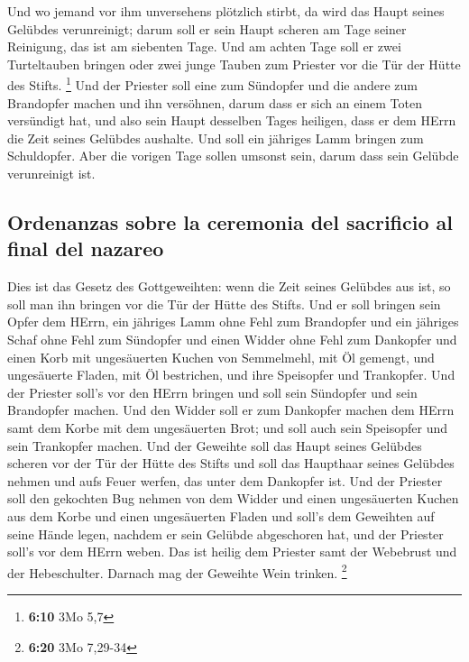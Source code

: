  Und wo jemand vor ihm unversehens plötzlich stirbt, da
wird das Haupt seines Gelübdes verunreinigt; darum soll er sein Haupt
scheren am Tage seiner Reinigung, das ist am siebenten Tage.
 Und am achten Tage soll er zwei Turteltauben bringen
oder zwei junge Tauben zum Priester vor die Tür der Hütte des Stifts.
\footnote{\textbf{6:10} 3Mo 5,7}  Und der Priester soll
eine zum Sündopfer und die andere zum Brandopfer machen und ihn
versöhnen, darum dass er sich an einem Toten versündigt hat, und also
sein Haupt desselben Tages heiligen,  dass er dem HErrn
die Zeit seines Gelübdes aushalte. Und soll ein jähriges Lamm bringen
zum Schuldopfer. Aber die vorigen Tage sollen umsonst sein, darum dass
sein Gelübde verunreinigt ist.

\hypertarget{ordenanzas-sobre-la-ceremonia-del-sacrificio-al-final-del-nazareo}{%
\subsection{Ordenanzas sobre la ceremonia del sacrificio al final del
nazareo}\label{ordenanzas-sobre-la-ceremonia-del-sacrificio-al-final-del-nazareo}}

 Dies ist das Gesetz des Gottgeweihten: wenn die Zeit
seines Gelübdes aus ist, so soll man ihn bringen vor die Tür der Hütte
des Stifts.  Und er soll bringen sein Opfer dem HErrn,
ein jähriges Lamm ohne Fehl zum Brandopfer und ein jähriges Schaf ohne
Fehl zum Sündopfer und einen Widder ohne Fehl zum Dankopfer
 und einen Korb mit ungesäuerten Kuchen von Semmelmehl,
mit Öl gemengt, und ungesäuerte Fladen, mit Öl bestrichen, und ihre
Speisopfer und Trankopfer.  Und der Priester soll's vor
den HErrn bringen und soll sein Sündopfer und sein Brandopfer machen.
 Und den Widder soll er zum Dankopfer machen dem HErrn
samt dem Korbe mit dem ungesäuerten Brot; und soll auch sein Speisopfer
und sein Trankopfer machen.  Und der Geweihte soll das
Haupt seines Gelübdes scheren vor der Tür der Hütte des Stifts und soll
das Haupthaar seines Gelübdes nehmen und aufs Feuer werfen, das unter
dem Dankopfer ist.  Und der Priester soll den gekochten
Bug nehmen von dem Widder und einen ungesäuerten Kuchen aus dem Korbe
und einen ungesäuerten Fladen und soll's dem Geweihten auf seine Hände
legen, nachdem er sein Gelübde abgeschoren hat,  und der
Priester soll's vor dem HErrn weben. Das ist heilig dem Priester samt
der Webebrust und der Hebeschulter. Darnach mag der Geweihte Wein
trinken. \footnote{\textbf{6:20} 3Mo 7,29-34}

